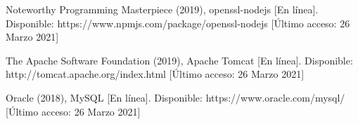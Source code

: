 \documentclass[12pt, a4paper, titlepage]{report}
\begin{document}
\begin{thebibliography}{20}
        Noteworthy Programming Masterpiece (2019), openssl-nodejs [En línea]. Disponible: https://www.npmjs.com/package/openssl-nodejs [Último acceso: 26 Marzo 2021]
        
        The Apache Software Foundation (2019), Apache Tomcat [En línea]. Disponible: http://tomcat.apache.org/index.html [Último acceso: 26 Marzo 2021]
        
        Oracle (2018), MySQL [En línea]. Disponible: https://www.oracle.com/mysql/ [Último acceso: 26 Marzo 2021]
        
	\end{thebibliography}	
\end{document}
